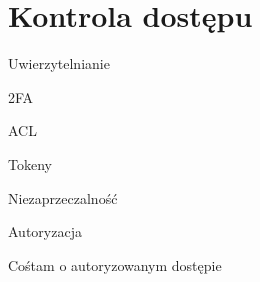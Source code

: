 \section{Kontrola dostępu}

\begin{frame}{Uwierzytelnianie}

\end{frame}

\begin{frame}{2FA}
	
\end{frame}

\begin{frame}{ACL}
	
\end{frame}

\begin{frame}{Tokeny}
	
\end{frame}

\begin{frame}{Niezaprzeczalność}
	
\end{frame}

\begin{frame}{Autoryzacja}
	
\end{frame}

\begin{frame}{Cośtam o autoryzowanym dostępie}
	
\end{frame}


